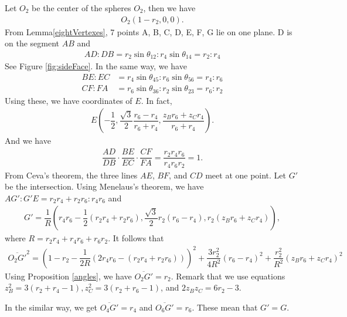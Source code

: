 \documentclass[suppldata, dvipdfmx]{interact}
\theoremstyle{plain}%
\theoremstyle{definition}
\theoremstyle{remark}
\theoremstyle{problemstyle}
\begin{document}
Let $O_2$ be the center of the spheres $O_2$, then we have
\begin{align*}
 O_2(1 - r_2, 0, 0).
\end{align*}
From Lemma\ref{eightVertexes}, 7 points A, B, C, D, E, F, G lie on one plane. D is on
the segment $AB$ and
\begin{align*}
 AD : DB = r_2\sin\theta_{12} : r_4\sin\theta_{14} = r_2 : r_4
\end{align*}
See Figure \ref{fig:sideFace}. In the same way, we have
\begin{align*}
 BE : EC &= r_4\sin\theta_{45} : r_6\sin\theta_{56} = r_4:r_6\\
 CF : FA &= r_6\sin\theta_{36} : r_2\sin\theta_{23} = r_6:r_2
\end{align*}
Using these, we have coordinates of $E$. In fact,
\begin{align*}
 E(-\dfrac{1}{2},\dfrac{\sqrt{3}}{2}\dfrac{r_6-r_4}{r_6 + r_4},
 \dfrac{z_Br_6 + z_C r_4}{r_6 + r_4}).
\end{align*}
And we have
\begin{align*}
 \dfrac{AD}{DB} \cdot \dfrac{BE}{EC} \cdot \dfrac{CF}{FA} = \dfrac{r_2r_4r_6}{r_4r_6r_2} = 1.
\end{align*}
From Ceva's theorem, the three lines $AE$, $BF$, and $CD$ meet at one
point. Let $G'$ be the intersection. Using Menelaus's theorem, we have
$AG':G'E = r_2r_4 + r_2r_6:r_4r_6$ and
\begin{align*}
 G' = \dfrac{1}{R}(r_4r_6 - \dfrac{1}{2}(r_2r_4 + r_2r_6), 
 \dfrac{\sqrt{3}}{2}r_2(r_6 - r_4), r_2(z_Br_6 + z_Cr_4)),
\end{align*}
where $R = r_2r_4 + r_4r_6 + r_6r_2.$ It follows that
\begin{align*}
 \overline{O_2G'}^2 = (1 - r_2 - \dfrac{1}{2R}(2r_4r_6 - (r_2r_4 +
 r_2r_6)))^2 + \dfrac{3r^2_2}{4R^2}(r_6 - r_4)^2 +
 \dfrac{r_2^2}{R^2}(z_Br_6 + z_Cr_4)^2
\end{align*}
Using Proposition \ref{angles}, we have $\overline{O_2G'} = r_2$.
Remark that we
use equations $z_B^2 = 3(r_2 + r_4 - 1), z_C^2 = 3(r_2 + r_6 - 1)$, and
$2z_Bz_C = 6r_2 - 3$.

In the similar way, we get $\overline{O_4G'} = r_4$ and 
$\overline{O_6G'} = r_6$. These mean that $G' = G$.
\end{document}
